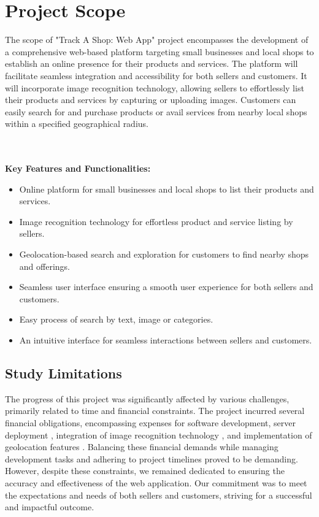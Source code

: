 \vspace{0.5cm}
\section{Project Scope}
The scope of "Track A Shop: Web App" project encompasses the development of a comprehensive web-based platform targeting small businesses and local shops to establish an online presence for their products and services. The platform will facilitate seamless integration and accessibility for both sellers and customers. It will incorporate image recognition technology, allowing sellers to effortlessly list their products and services by capturing or uploading images. Customers can easily search for and purchase products or avail services from nearby local shops within a specified geographical radius.

\textbf{\\\\Key Features and Functionalities:}
\begin{itemize}
	\item Online platform for small businesses and local shops to list their products and services.
	\item Image recognition technology \citep{aws-rekognition} for effortless product and service listing by sellers.
	\item Geolocation-based search and exploration for customers to find nearby shops and offerings.
	\item Seamless user interface ensuring a smooth user experience for both sellers and customers.
	\item Easy process of search by text, image or categories.
	\item An intuitive interface for seamless interactions between sellers and customers.
\end{itemize}

\vspace{0.5cm}
\subsection{Study Limitations}

The progress of this project was significantly affected by various challenges, primarily related to time and financial constraints. The project incurred several financial obligations, encompassing expenses for software development, server deployment \citep{heroku-docs}, integration of image recognition technology \citep{aws-rekognition}, and implementation of geolocation  features \citep{google-maps-docs}. Balancing these financial demands while managing development tasks and adhering to project timelines proved to be demanding. However, despite these constraints, we remained dedicated to ensuring the accuracy and effectiveness of the web application. Our commitment was to meet the expectations and needs of both sellers and customers, striving for a successful and impactful outcome.

